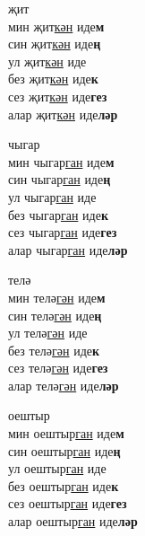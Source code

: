 \begin{multicols}{4}
\begin{enumerate}
\begin{minipage}{\linewidth}
    \item
    җит\\
    мин җит\underline{кән} иде\textbf{м}\\
    син җит\underline{кән} иде\textbf{ң}\\
    ул җит\underline{кән} иде\\
    без җит\underline{кән} иде\textbf{к}\\
    сез җит\underline{кән} иде\textbf{гез}\\
    алар җит\underline{кән} иде\textbf{ләр}\\
\end{minipage}

\begin{minipage}{\linewidth}
    \item
    чыгар\\
    мин чыгар\underline{ган} иде\textbf{м}\\
    син чыгар\underline{ган} иде\textbf{ң}\\
    ул чыгар\underline{ган} иде\\
    без чыгар\underline{ган} иде\textbf{к}\\
    сез чыгар\underline{ган} иде\textbf{гез}\\
    алар чыгар\underline{ган} иде\textbf{ләр}\\
\end{minipage}

\begin{minipage}{\linewidth}
    \item
    телә\\
    мин телә\underline{гән} иде\textbf{м}\\
    син телә\underline{гән} иде\textbf{ң}\\
    ул телә\underline{гән} иде\\
    без телә\underline{гән} иде\textbf{к}\\
    сез телә\underline{гән} иде\textbf{гез}\\
    алар телә\underline{гән} иде\textbf{ләр}\\
\end{minipage}

\begin{minipage}{\linewidth}
    \item
    оештыр\\
    мин оештыр\underline{ган} иде\textbf{м}\\
    син оештыр\underline{ган} иде\textbf{ң}\\
    ул оештыр\underline{ган} иде\\
    без оештыр\underline{ган} иде\textbf{к}\\
    сез оештыр\underline{ган} иде\textbf{гез}\\
    алар оештыр\underline{ган} иде\textbf{ләр}\\
\end{minipage}


\end{enumerate}
\end{multicols}
